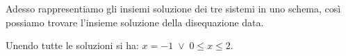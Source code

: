 \begin{exrig}
\begin{esempio}
Adesso rappresentiamo gli insiemi soluzione dei tre sistemi in uno schema, così possiamo trovare l'insieme soluzione della disequazione data.

\begin{center}

\end{center}

Unendo tutte le soluzioni si ha: $x=-1\;\vee\; 0\le x\le 2$.
\end{esempio}
\end{exrig}
\ovalbox{\risolvii \ref{ese:7.30}, \ref{ese:7.31}, \ref{ese:7.32}, \ref{ese:7.33}, \ref{ese:7.34}, \ref{ese:7.35}, \ref{ese:7.36}}

\newpage

\cleardoublepage
